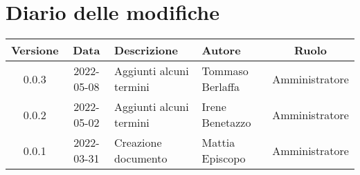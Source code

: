 \section*{Diario delle modifiche}
	\begin{center}
	\renewcommand{\arraystretch}{1.8} %
	\begin{tabular}{ |c|c|m{12em}|m{7em}|c| }
	\hline
	\textbf{Versione} & \textbf{Data} & \textbf{Descrizione} &  \textbf{Autore} &  \textbf{Ruolo} \\ %
	\hline
    0.0.3 & 2022-05-08 & Aggiunti alcuni termini & Tommaso Berlaffa & Amministratore\\
  \hline
    0.0.2 & 2022-05-02 & Aggiunti alcuni termini & Irene Benetazzo & Amministratore\\
	\hline
    0.0.1 & 2022-03-31 & Creazione documento & Mattia \newline Episcopo & Amministratore\\ %
	\hline
	\end{tabular}
	\end{center}
	\newpage